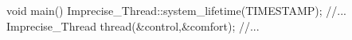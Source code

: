 void main() {
    Imprecise_Thread::system_lifetime(TIMESTAMP);
    //...
    Imprecise_Thread thread(&control,&comfort);
    //...
}